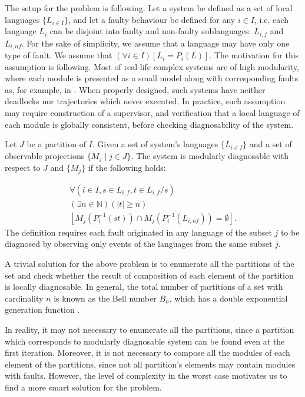 The setup for the problem is following. Let a system be defined as a set of
local languages $\{L_{i\in I}\}$, and let a faulty behaviour be defined for any
$i \in I$, i.e. each language $L_i$ can be disjoint into faulty and non-faulty
sublanguages: $L_{i,f}$ and $L_{i,nf}$. 
For the sake of simplicity, we assume that a language may have only one type of
fault. We assume that $(\forall i \in I)\left[ L_i = P_i(L)\right]$. The
motivation for this assumption is following. Most of real-life complex systems
are of high modularity, where each module is presented as a small model along
with corresponding faults as, for example, in \cite{sartini_methodology_2010}.
When properly designed, such systems have neither deadlocks nor trajectories
which never executed. In practice, such assumption may require construction of a
supervisor, and verification that a local language of each module is globally
consistent, before checking diagnosability of the system.

\begin{definition}
Let $J$ be a partition of $I$. Given a set of system's languages $\{L_{i \in
I}\}$ and a set of observable projections $\{M_j \mid j \in J \}$. 
The system is modularly diagnosable with respect to $J$ and $\{M_j\}$ 
if the following holds:
\end{definition}
\begin{equation}
	\begin{array}{l}
		\forall(i \in I, s \in L_{i,f}, t \in L_{i,f}/s)
		\\
		(\exists n \in \mathbb{N})
		(|t| \geq n)
		\\
		\left[ M_j(P_i^{-1}(st)) \cap M_j(P_i^{-1}(L_{i,nf})) = \emptyset \right].
	\end{array}
\end{equation}
The definition requires each fault originated in any language of the subset $j$
to be diagnosed by observing only events of the languages from the same subset
$j$.

A trivial solution for the above problem is to enumerate all the partitions of
the set and check whether the result of composition of each element of the
partition is locally diagnosable. In general, the total number of partitions of
a set with cardinality $n$ is known as the Bell number $B_n$, which has a double
exponential generation function \cite{brualdi_introductory_2004}.

In reality, it may not necessary to enumerate all the partitions, since a
partition which corresponds to modularly diagnosable system can be found even at
the first iteration. Moreover, it is not necessary to compose all the modules of
each element of the partitions, since not all partition's elements may contain
modules with faults. However, the level of complexity in the worst case
motivates us to find a more smart solution for the problem.

